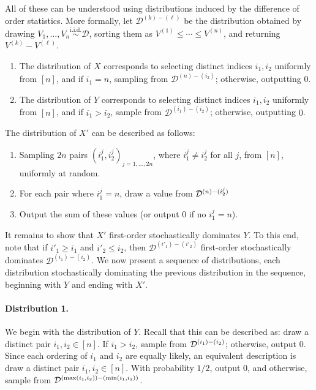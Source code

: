     All of these can be understood using distributions induced by the difference of order statistics. More formally, let $\mathcal{D}^{(k) - (\ell)}$ be the distribution obtained by drawing $V_1, \ldots, V_n \stackrel{\text{i.i.d.}}{\sim} \mathcal{D}$, sorting them as $V^{(1)} \le \cdots \le V^{(n)}$, and returning $V^{(k)} - V^{(\ell)}$.
    \begin{enumerate}
        \item  The distribution of $X$ corresponds to selecting distinct indices $i_1, i_2$ uniformly from $[n]$, and if $i_1 = n$, sampling from $\mathcal{D}^{(n) - (i_2)}$; otherwise, outputting $0$. 
        \item The distribution of $Y$ corresponds to selecting distinct indices $i_1, i_2$ uniformly from $[n]$, and if $i_1 > i_2$, sample from $\mathcal{D}^{(i_1) - (i_2)}$; otherwise, outputting $0$. 
    \end{enumerate}

The distribution of $X'$ can be described as follows:
    \begin{enumerate}
        \item Sampling $2n$ pairs $(i^j_1, i^j_2)_{j = 1, \ldots, 2n}$, where $i^j_1 \neq i^j_2$ for all $j$, from $[n]$, uniformly at random.
        \item For each pair where $i^j_1 = n$, draw a value from $\mathcal{D}^{(n) - (i^j_2)}$
        \item Output the sum of these values (or output $0$ if no $i^j_1 = n$).
    \end{enumerate} 

    It remains to show that $X'$ first-order stochastically dominates  $Y$. To this end, note that if $i'_1 \ge i_1$ and $i'_2 \le i_2$, then $\mathcal{D}^{(i'_1) - (i'_2)}$ first-order stochastically dominates $\mathcal{D}^{(i_1) - (i_2)}$. We now present a sequence of distributions, each distribution stochastically dominating the previous distribution in the sequence, beginning with $Y$ and ending with $X'$. 

    

    \paragraph{Distribution 1.} We begin with the distribution of $Y$. Recall that this can be described as: draw a distinct pair $i_1, i_2 \in [n]$. If $i_1 > i_2$, sample from $\mathcal{D}^{(i_1) - (i_2)}$; otherwise, output $0$. Since each ordering of $i_1$ and $i_2$ are equally likely, an equivalent description is draw a distinct pair $i_1, i_2 \in [n]$. With probability $1/2$, output $0$, and otherwise, sample from $\mathcal{D}^{(\max(i_1, i_2)) - (\min(i_1, i_2))}$.

